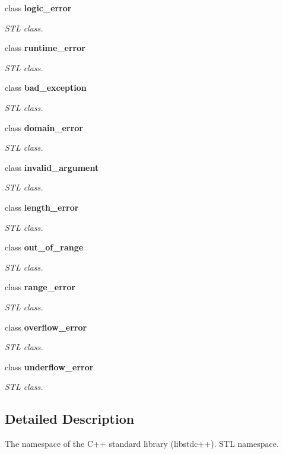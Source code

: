 \begin{DoxyCompactItemize}
class {\bfseries logic\_\-error}
\begin{DoxyCompactList}\small\item\em STL class. \item\end{DoxyCompactList}\item 
class {\bfseries runtime\_\-error}
\begin{DoxyCompactList}\small\item\em STL class. \item\end{DoxyCompactList}\item 
class {\bfseries bad\_\-exception}
\begin{DoxyCompactList}\small\item\em STL class. \item\end{DoxyCompactList}\item 
class {\bfseries domain\_\-error}
\begin{DoxyCompactList}\small\item\em STL class. \item\end{DoxyCompactList}\item 
class {\bfseries invalid\_\-argument}
\begin{DoxyCompactList}\small\item\em STL class. \item\end{DoxyCompactList}\item 
class {\bfseries length\_\-error}
\begin{DoxyCompactList}\small\item\em STL class. \item\end{DoxyCompactList}\item 
class {\bfseries out\_\-of\_\-range}
\begin{DoxyCompactList}\small\item\em STL class. \item\end{DoxyCompactList}\item 
class {\bfseries range\_\-error}
\begin{DoxyCompactList}\small\item\em STL class. \item\end{DoxyCompactList}\item 
class {\bfseries overflow\_\-error}
\begin{DoxyCompactList}\small\item\em STL class. \item\end{DoxyCompactList}\item 
class {\bfseries underflow\_\-error}
\begin{DoxyCompactList}\small\item\em STL class. \item\end{DoxyCompactList}\end{DoxyCompactItemize}


\subsection{Detailed Description}
The namespace of the C++ standard library (libstdc++). STL namespace. 